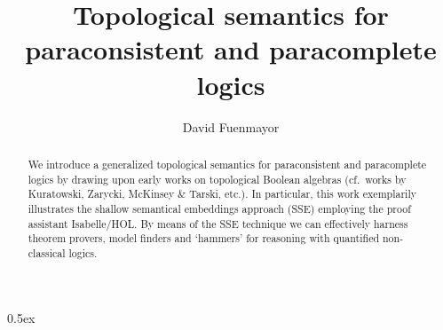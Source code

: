 \documentclass[11pt,a4paper]{article}
\begin{document}
\title{Topological semantics for paraconsistent and paracomplete logics}
\author{David Fuenmayor}

\maketitle

\begin{abstract}
	We introduce a generalized topological semantics for paraconsistent and paracomplete logics by drawing upon early works on topological Boolean algebras (cf.~works by Kuratowski, Zarycki, McKinsey \& Tarski, etc.). In particular, this work exemplarily illustrates the shallow semantical embeddings approach (SSE) employing the proof assistant Isabelle/HOL. By means of the SSE technique we can effectively harness theorem provers, model finders and `hammers' for reasoning with quantified non-classical logics.
\end{abstract}

\tableofcontents

\vspace*{40pt}
\parindent 0pt\parskip 0.5ex





\end{document}
